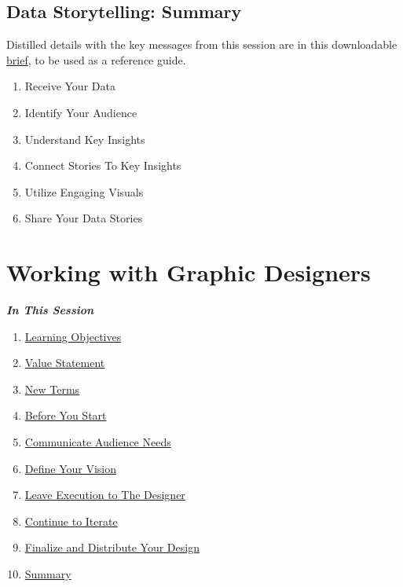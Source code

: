 \documentclass[
]{book}
\providecommand{\tightlist}{%
  \setlength{\itemsep}{0pt}\setlength{\parskip}{0pt}}
\begin{document}
\hypertarget{data-storytelling-summary}{%
\subsection{Data Storytelling: Summary}\label{data-storytelling-summary}}

Distilled details with the key messages from this session are in this downloadable \href{files/M4S2_Data_Storytelling_Brief.pdf}{brief}, to be used as a reference guide.

\begin{enumerate}
\def\labelenumi{\arabic{enumi}.}
\tightlist
\item
  Receive Your Data
\item
  Identify Your Audience
\item
  Understand Key Insights
\item
  Connect Stories To Key Insights
\item
  Utilize Engaging Visuals
\item
  Share Your Data Stories
\end{enumerate}

\hypertarget{working-with-graphic-designers}{%
\section{Working with Graphic Designers}\label{working-with-graphic-designers}}

\textbf{\emph{In This Session }}

\begin{enumerate}
\def\labelenumi{\arabic{enumi}.}
\tightlist
\item
  \protect\hyperlink{working-with-graphic-designers-learning-objectives}{Learning Objectives}
\item
  \protect\hyperlink{working-with-graphic-designers-value-statement}{Value Statement}
\item
  \protect\hyperlink{working-with-graphic-designers-new-terms}{New Terms}
\item
  \protect\hyperlink{before-you-start}{Before You Start}
\item
  \protect\hyperlink{communicate-audience-needs}{Communicate Audience Needs}
\item
  \protect\hyperlink{define-your-vision}{Define Your Vision}
\item
  \protect\hyperlink{leave-execution-to-the-designer}{Leave Execution to The Designer}
\item
  \protect\hyperlink{continue-to-iterate}{Continue to Iterate}
\item
  \protect\hyperlink{finalize-and-distribute-your-design}{Finalize and Distribute Your Design}
\item
  \protect\hyperlink{working-with-graphic-designers-summary}{Summary}
\end{enumerate}
\end{document}
